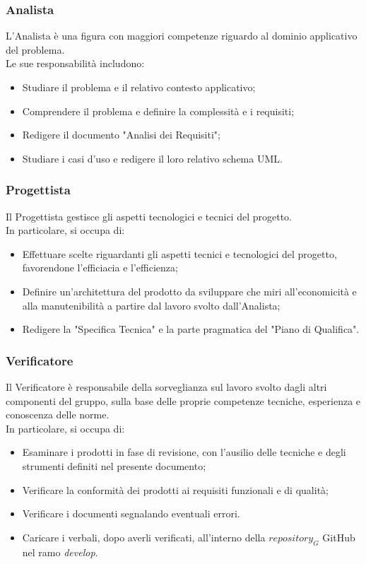 \subsubsection{Analista}
L'Analista è una figura con maggiori competenze riguardo al dominio applicativo del problema. \\
Le sue responsabilità includono:
\begin{itemize}
    \item Studiare il problema e il relativo contesto applicativo;
    \item Comprendere il problema e definire la complessità e i requisiti;
    \item Redigere il documento "Analisi dei Requisiti";
    \item Studiare i casi d'uso e redigere il loro relativo schema UML.
\end{itemize}
\subsubsection{Progettista}
Il Progettista gestisce gli aspetti tecnologici e tecnici del progetto. \\
In particolare, si occupa di:
\begin{itemize}
    \item Effettuare scelte riguardanti gli aspetti tecnici e tecnologici del progetto, favorendone l'efficiacia e l'efficienza;
    \item Definire un'architettura del prodotto da sviluppare che miri all'economicità e alla manutenibilità a partire dal lavoro svolto dall'Analista;
    \item Redigere la "Specifica Tecnica" e la parte pragmatica del "Piano di Qualifica".
\end{itemize}
\subsubsection{Verificatore}
Il Verificatore è responsabile della sorveglianza sul lavoro svolto dagli altri componenti del gruppo, sulla base delle proprie competenze tecniche, esperienza e conoscenza delle norme. \\
In particolare, si occupa di:
\begin{itemize}
    \item Esaminare i prodotti in fase di revisione, con l'ausilio delle tecniche e degli strumenti definiti nel presente documento;
    \item Verificare la conformità dei prodotti ai requisiti funzionali e di qualità;
    \item Verificare i documenti segnalando eventuali errori.
    \item Caricare i verbali, dopo averli verificati, all'interno della $\textit{repository}_G$ GitHub nel ramo \textit{develop}.
\end{itemize}
